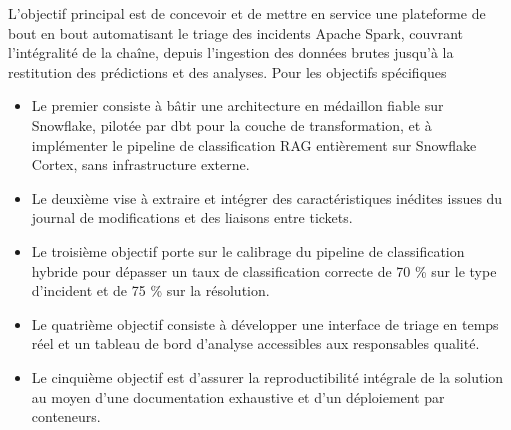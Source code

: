 L'objectif principal est de concevoir et de mettre en service une plateforme de bout en bout automatisant le triage des incidents Apache Spark, couvrant l'intégralité de la chaîne, depuis l'ingestion des données brutes jusqu'à la restitution des prédictions et des analyses.
Pour les objectifs spécifiques
\begin{itemize}
    \item Le premier consiste à bâtir une architecture en médaillon fiable sur Snowflake, pilotée par dbt pour la couche de transformation, et à implémenter le pipeline de classification RAG entièrement sur Snowflake Cortex, sans infrastructure externe.
    \item Le deuxième vise à extraire et intégrer des caractéristiques inédites issues du journal de modifications et des liaisons entre tickets. 
    \item Le troisième objectif porte sur le calibrage du pipeline de classification hybride pour dépasser un taux de classification correcte de 70 \% sur le type d'incident et de 75 \% sur la résolution. 
    \item Le quatrième objectif consiste à développer une interface de triage en temps réel et un tableau de bord d'analyse accessibles aux responsables qualité.
    \item Le cinquième objectif est d'assurer la reproductibilité intégrale de la solution au moyen d'une documentation exhaustive et d'un déploiement par conteneurs.
\end{itemize}
